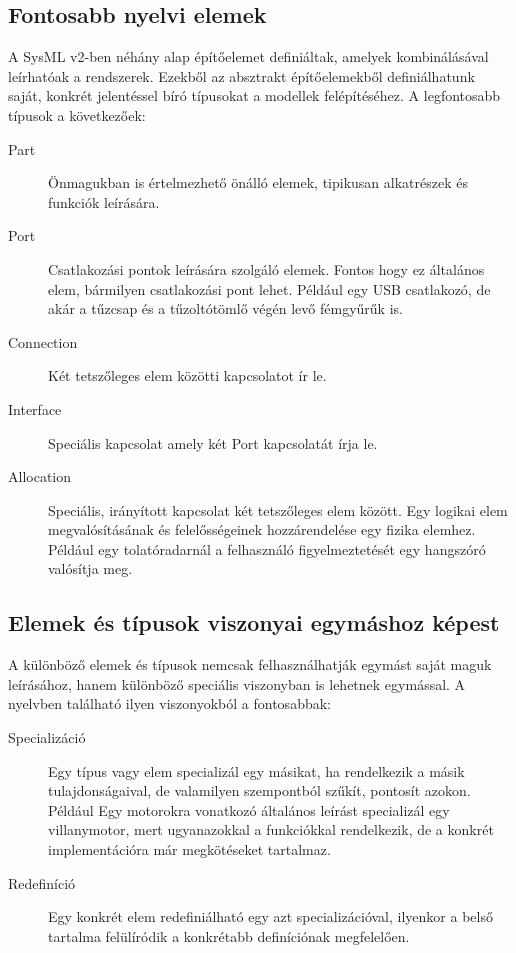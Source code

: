     \subsection{Fontosabb nyelvi elemek} \label{sec:NyelviElemek}
    A SysML v2-ben néhány alap építőelemet definiáltak, amelyek kombinálásával leírhatóak a rendszerek. Ezekből az absztrakt építőelemekből definiálhatunk saját, konkrét jelentéssel bíró típusokat a modellek felépítéséhez. A legfontosabb típusok a következőek:
    \begin{description}
        \item[Part] Önmagukban is értelmezhető önálló elemek, tipikusan alkatrészek és funkciók leírására.
        \item[Port] Csatlakozási pontok leírására szolgáló elemek. Fontos hogy ez általános elem, bármilyen csatlakozási pont lehet. Például egy USB csatlakozó, de akár a tűzcsap és a tűzoltótömlő végén levő fémgyűrűk is.
        \item[Connection] Két tetszőleges elem közötti kapcsolatot ír le.
        \item[Interface] Speciális kapcsolat amely két Port kapcsolatát írja le.
        \item[Allocation] Speciális, irányított kapcsolat két tetszőleges elem között. Egy logikai elem megvalósításának és felelősségeinek hozzárendelése egy fizika elemhez. Például egy tolatóradarnál a felhasználó figyelmeztetését egy hangszóró valósítja meg.
    \end{description}

    \subsection{Elemek és típusok viszonyai egymáshoz képest}
    A különböző elemek és típusok nemcsak felhasználhatják egymást saját maguk leírásához, hanem különböző speciális viszonyban is lehetnek egymással.
    A nyelvben található ilyen viszonyokból a fontosabbak:
    \begin{description}
        \item[Specializáció] Egy típus vagy elem specializál egy másikat, ha rendelkezik a másik tulajdonságaival, de valamilyen szempontból szűkít, pontosít azokon. Például Egy motorokra vonatkozó általános leírást specializál egy villanymotor, mert ugyanazokkal a funkciókkal rendelkezik, de a konkrét implementációra már megkötéseket tartalmaz.
        \item[Redefiníció] Egy konkrét elem redefiniálható egy azt specializációval, ilyenkor a belső tartalma felülíródik a konkrétabb definíciónak megfelelően.
    \end{description}

